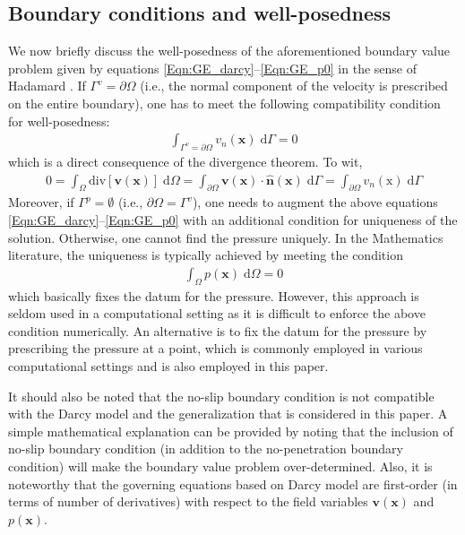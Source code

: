 \documentclass[11pt,reqno]{amsart}
\begin{document}
\subsection{Boundary conditions and well-posedness}
We now briefly discuss the well-posedness of the 
aforementioned boundary value problem given by 
equations \eqref{Eqn:GE_darcy}--\eqref{Eqn:GE_p0} 
in the sense of Hadamard \cite{McOwen}. If $\Gamma^{v} 
= \partial \Omega$ (i.e., the normal component of the 
velocity is prescribed on the entire boundary), one 
has to meet the following compatibility condition 
for well-posedness:
\begin{align}
  \int_{\Gamma^{v} = \partial \Omega} v_n(\mathbf{x}) 
  \; \mathrm{d} \Gamma = 0
  \end{align}
which is a direct consequence of the divergence theorem. 
To wit, 
\begin{align}
  0 = \int_{\Omega} \mathrm{div}[\mathbf{v}(\mathbf{x})] 
  \; \mathrm{d} \Omega = \int_{\partial \Omega} \mathbf{v}
  (\mathbf{x}) \cdot \hat{\mathbf{n}}(\mathbf{x}) \; 
  \mathrm{d} \Gamma = \int_{\partial \Omega} v_n(\mathrm{x}) 
  \; \mathrm{d} \Gamma
\end{align}
Moreover, if $\Gamma^{p} = \emptyset$ (i.e., $\partial 
\Omega = \Gamma^{v}$), one needs to augment the above 
equations \eqref{Eqn:GE_darcy}--\eqref{Eqn:GE_p0} with 
an additional condition for uniqueness of the solution. 
Otherwise, one cannot find the pressure uniquely. In 
the Mathematics literature, the uniqueness is typically 
achieved by meeting the condition
\begin{align}
  \int_{\Omega} p(\mathbf{x}) \; \mathrm{d} \Omega = 0
\end{align}
which basically fixes the datum for the pressure. However, 
this approach is seldom used in a computational setting as 
it is difficult to enforce the above condition numerically. 
An alternative is to fix the datum for the pressure by 
prescribing the pressure at a point, which is commonly 
employed in various computational settings and is also 
employed in this paper. 

It should also be noted that the no-slip boundary 
condition is not compatible with the Darcy model 
and the generalization that is considered in this 
paper. A simple mathematical explanation can be 
provided by noting that the inclusion of no-slip 
boundary condition (in addition to the no-penetration 
boundary condition) will make the boundary value 
problem over-determined. Also, it is noteworthy 
that the governing equations based on Darcy model 
are first-order (in terms of number of derivatives) 
with respect to the field variables $\mathbf{v}
(\mathbf{x})$ and $p(\mathbf{x})$. 
\end{document}
